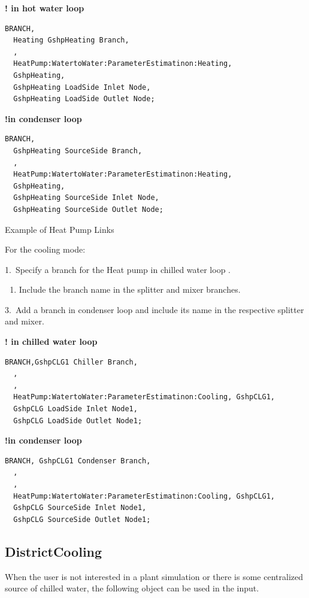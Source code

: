\textbf{! in hot water loop}

\begin{lstlisting}
BRANCH,
  Heating GshpHeating Branch,
  ,
  HeatPump:WatertoWater:ParameterEstimatinon:Heating,
  GshpHeating,
  GshpHeating LoadSide Inlet Node,
  GshpHeating LoadSide Outlet Node;
\end{lstlisting}

\textbf{!in condenser loop}

\begin{lstlisting}
BRANCH,
  GshpHeating SourceSide Branch,
  ,
  HeatPump:WatertoWater:ParameterEstimatinon:Heating,
  GshpHeating,
  GshpHeating SourceSide Inlet Node,
  GshpHeating SourceSide Outlet Node;
\end{lstlisting}

Example of Heat Pump Links

For the cooling mode:

1.~Specify a branch for the Heat pump in chilled water loop .

\begin{enumerate}
    \def\labelenumi{\arabic{enumi}.}
    \setcounter{enumi}{1}
    \tightlist
    \item
    Include the branch name in the splitter and mixer branches.
\end{enumerate}

3.~Add a branch in condenser loop and include its name in the respective splitter and mixer.

\textbf{! in chilled water loop}

\begin{lstlisting}
BRANCH,GshpCLG1 Chiller Branch,
  ,
  ,
  HeatPump:WatertoWater:ParameterEstimatinon:Cooling, GshpCLG1,
  GshpCLG LoadSide Inlet Node1,
  GshpCLG LoadSide Outlet Node1;
\end{lstlisting}

\textbf{!in condenser loop}

\begin{lstlisting}
BRANCH, GshpCLG1 Condenser Branch,
  ,
  ,
  HeatPump:WatertoWater:ParameterEstimatinon:Cooling, GshpCLG1,
  GshpCLG SourceSide Inlet Node1,
  GshpCLG SourceSide Outlet Node1;
\end{lstlisting}

\subsection{DistrictCooling}\label{districtcooling}

When the user is not interested in a plant simulation or there is some centralized source of chilled water, the following object can be used in the input.

